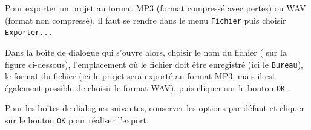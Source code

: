 Pour exporter un projet au format MP3 (format compressé avec pertes) ou WAV (format non compressé), il faut se rendre dans le menu \texttt{Fichier} puis choisir \texttt{Exporter...}

\vspace{6pt}

Dans la boîte de dialogue qui s'ouvre alors, choisir le nom du fichier ( sur la figure ci-dessous), l'emplacement où le fichier doit être enregistré  (ici le \texttt{Bureau}), le format du fichier  (ici le projet sera exporté au format MP3, mais il est également possible de choisir le format WAV), puis cliquer sur le bouton \texttt{OK} .       


Pour les boîtes de dialogues suivantes, conserver les options par défaut et cliquer sur le bouton \texttt{OK} pour réaliser l'export. 




